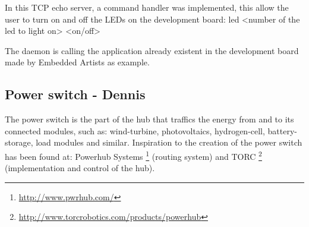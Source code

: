 In this TCP echo server, a command handler was implemented, this allow the user to turn on and off the LEDs on the development board: led <number of the led to light on> <on/off>

The daemon is calling the application already existent in the development board made by Embedded Artists as example.

\subsection{Power switch - Dennis}
The power switch is the part of the hub that traffics the energy from and to its connected modules, such as: wind-turbine, photovoltaics, hydrogen-cell, battery-storage, load modules and similar. Inspiration to the creation of the power switch has been found at: Powerhub Systems \footnote{\url{http://www.pwrhub.com/}} (routing system) and TORC \footnote{\url{http://www.torcrobotics.com/products/powerhub}} (implementation and control of the hub).
